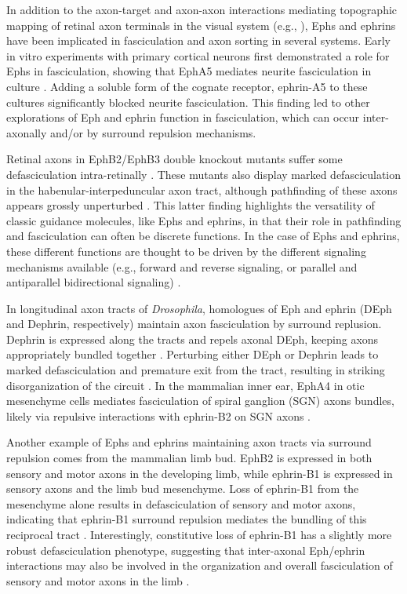 \label{sec:EphFascic}
In addition to the axon-target and axon-axon interactions mediating topographic mapping of retinal axon terminals in the visual system (e.g., ), Ephs and ephrins have been implicated in fasciculation and axon sorting in several systems.
Early in vitro experiments with primary cortical neurons first demonstrated a role for Ephs in fasciculation, showing that EphA5 mediates neurite fasciculation in culture \cite{winslow1995cloning}.
Adding a soluble form of the cognate receptor, ephrin-A5 to these cultures significantly blocked neurite fasciculation.
This finding led to other explorations of Eph and ephrin function in fasciculation, which can occur inter-axonally and/or by surround repulsion mechanisms.

Retinal axons in EphB2/EphB3 double knockout mutants suffer some defasciculation intra-retinally \cite{birgbauer2000kinase}.
These mutants also display marked defasciculation in the habenular-interpeduncular axon tract, although pathfinding of these axons appears grossly unperturbed \cite{orioli1996sek4}.
This latter finding highlights the versatility of classic guidance molecules, like Ephs and ephrins, in that their role in pathfinding and fasciculation can often be discrete functions.
In the case of Ephs and ephrins, these different functions are thought to be driven by the different signaling mechanisms available (e.g., forward and reverse signaling, or parallel and antiparallel bidirectional signaling) \cite{egea2007bidirectional,klein2014ephrin,kania2016mechanisms}.

In longitudinal axon tracts of \emph{Drosophila}, homologues of Eph and ephrin (DEph and Dephrin, respectively) maintain axon fasciculation by surround replusion.
Dephrin is expressed along the tracts and repels axonal DEph, keeping axons appropriately bundled together \cite{bossing2002dephrin}.
Perturbing either DEph or Dephrin leads to marked defasciculation and premature exit from the tract, resulting in striking disorganization of the circuit \cite{bossing2002dephrin}.
In the mammalian inner ear, EphA4 in otic mesenchyme cells mediates fasciculation of spiral ganglion (SGN) axons bundles, likely via repulsive interactions with ephrin-B2 on SGN axons \cite{coate2012otic}.

Another example of Ephs and ephrins maintaining axon tracts via surround repulsion comes from the mammalian limb bud.
EphB2 is expressed in both sensory and motor axons in the developing limb, while ephrin-B1 is expressed in sensory axons and the limb bud mesenchyme.
Loss of ephrin-B1 from the mesenchyme alone results in defasciculation of sensory and motor axons, indicating that ephrin-B1 surround repulsion mediates the bundling of this reciprocal tract \cite{luxey2013eph}.
Interestingly, constitutive loss of ephrin-B1 has a slightly more robust defasciculation phenotype, suggesting that inter-axonal Eph/ephrin interactions may also be involved in the organization and overall fasciculation of sensory and motor axons in the limb \cite{luxey2013eph}.

